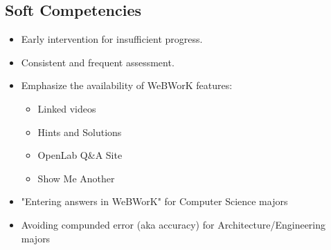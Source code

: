\documentclass{ximera}
\begin{document}
\subsection{Soft Competencies}

\begin{itemize}
 \item Early intervention for insufficient progress.
 \item Consistent and frequent assessment.
 \item Emphasize the availability of WeBWorK features:
 \begin{itemize}
  \item Linked videos
  \item Hints and Solutions
  \item OpenLab Q&A Site
  \item Show Me Another
 \end{itemize}
 \item "Entering answers in WeBWorK" for Computer Science majors
 \item Avoiding compunded error (aka accuracy) for Architecture/Engineering majors
\end{itemize}
\end{document}
